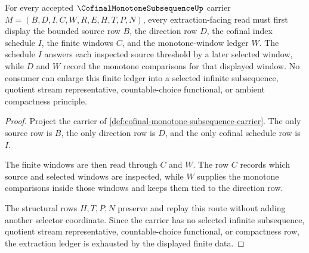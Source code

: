 \begin{theorem}
\label{thm:cofinal-monotone-subsequence-extraction-ledger}
For every accepted $\CofinalMonotoneSubsequenceUp$ carrier $M=(B,D,I,C,W,R,E,H,T,P,N)$, every extraction-facing read must first display the bounded source row $B$, the direction row $D$, the cofinal index schedule $I$, the finite windows $C$, and the monotone-window ledger $W$. The schedule $I$ answers each inspected source threshold by a later selected window, while $D$ and $W$ record the monotone comparisons for that displayed window. No consumer can enlarge this finite ledger into a selected infinite subsequence, quotient stream representative, countable-choice functional, or ambient compactness principle.
\end{theorem}
\begin{proof}
Project the carrier of \autoref{def:cofinal-monotone-subsequence-carrier}. The only source row is $B$, the only direction row is $D$, and the only cofinal schedule row is $I$.

The finite windows are then read through $C$ and $W$. The row $C$ records which source and selected windows are inspected, while $W$ supplies the monotone comparisons inside those windows and keeps them tied to the direction row.

The structural rows $H,T,P,N$ preserve and replay this route without adding another selector coordinate. Since the carrier has no selected infinite subsequence, quotient stream representative, countable-choice functional, or compactness row, the extraction ledger is exhausted by the displayed finite data.
\end{proof}


